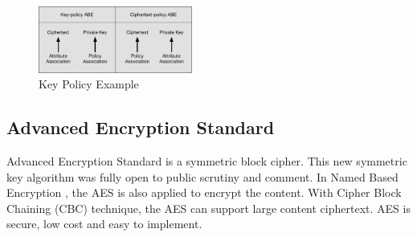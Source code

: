 \begin{figure}
  \centering
  \includegraphics[width=0.45\textwidth]{Figures/KPandCPABE}
  \caption{Key Policy Example}
  \label{fig:KPandCPABE}
\end{figure}

\subsection{Advanced Encryption Standard}
Advanced Encryption Standard is a symmetric block cipher. This new symmetric key algorithm was fully open to public scrutiny and comment. In Named Based Encryption \cite{yu2015name}, the AES is also applied to encrypt the content. With Cipher Block Chaining (CBC) technique, the AES can support large content ciphertext. AES is secure, low cost and easy to implement.
